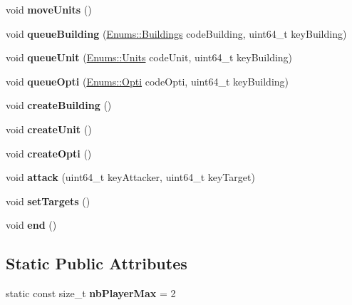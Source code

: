 \begin{DoxyCompactItemize}
\mbox{\label{class_game_1_1_game_a6712efb840aa776ba5770163c27a7dd6}} 
void {\bfseries move\+Units} ()
\item 
\mbox{\label{class_game_1_1_game_ad89f16336d45ddeb1c67f3ff5bc27622}} 
void {\bfseries queue\+Building} (\hyperlink{_enums_8hpp_add4fc5f0dd1a3afd564cd9461448b5fb}{Enums\+::\+Buildings} code\+Building, uint64\+\_\+t key\+Building)
\item 
\mbox{\label{class_game_1_1_game_a0c2bc1cd31e26c1cc9fb92d975383357}} 
void {\bfseries queue\+Unit} (\hyperlink{_enums_8hpp_a5de90297f23c12d88e6896fd4283a864}{Enums\+::\+Units} code\+Unit, uint64\+\_\+t key\+Building)
\item 
\mbox{\label{class_game_1_1_game_a3b142537750834388cc8b87d6b188d56}} 
void {\bfseries queue\+Opti} (\hyperlink{_enums_8hpp_aa338eae1354a35329bd6005bab3fbecb}{Enums\+::\+Opti} code\+Opti, uint64\+\_\+t key\+Building)
\item 
\mbox{\label{class_game_1_1_game_af3ba47ba9d3d39f2a57c71eb3fff3a22}} 
void {\bfseries create\+Building} ()
\item 
\mbox{\label{class_game_1_1_game_ac66074f6d88c1cea957db601e51ca347}} 
void {\bfseries create\+Unit} ()
\item 
\mbox{\label{class_game_1_1_game_abeb9c37475334253553ed185d6c13782}} 
void {\bfseries create\+Opti} ()
\item 
\mbox{\label{class_game_1_1_game_ad045a3ff5b78a783285ef99900584dd4}} 
void {\bfseries attack} (uint64\+\_\+t key\+Attacker, uint64\+\_\+t key\+Target)
\item 
\mbox{\label{class_game_1_1_game_af3b493de18bab3335abea9a17a083a3d}} 
void {\bfseries set\+Targets} ()
\item 
\mbox{\label{class_game_1_1_game_a9b5e9af4775817c9f898fa459f9ef2b6}} 
void {\bfseries end} ()
\end{DoxyCompactItemize}
\subsection*{Static Public Attributes}
\begin{DoxyCompactItemize}
\item 
\mbox{\label{class_game_1_1_game_a25b31adb532e32c26c291b7f2a0dab9f}} 
static const size\+\_\+t {\bfseries nb\+Player\+Max} = 2
\end{DoxyCompactItemize}
